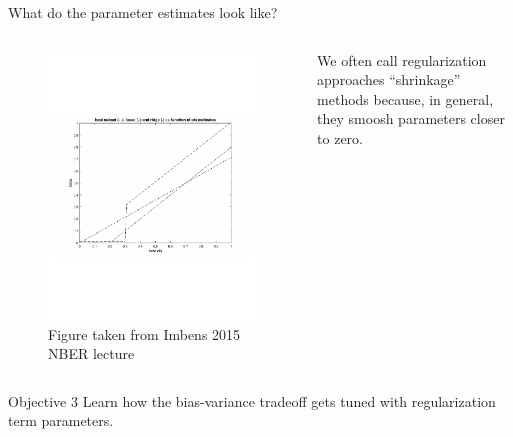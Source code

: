 \documentclass[mathserif, aspectratio=169]{beamer}
\begin{document}
\begin{frame}{What do the parameter estimates look like?}
\begin{columns}
\begin{figure}
\includegraphics[scale=0.5]{lasso-ridge-subset-vs-ols}
\caption*{\tiny Figure taken from Imbens 2015 NBER lecture}
\end{figure}
We often call regularization approaches ``shrinkage'' methods because, in general, they smoosh parameters closer to zero.
\end{columns}

\end{frame}


\begin{frame}{Objective 3}
Learn how the bias-variance tradeoff gets tuned with regularization term parameters. 
\end{frame}
\end{document}

